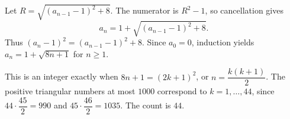 Let $R=\sqrt{(a_{n-1}-1)^2+8}$. The numerator is $R^2-1$, so cancellation gives
\[
a_n=1+\sqrt{(a_{n-1}-1)^2+8}.
\]
Thus $(a_n-1)^2=(a_{n-1}-1)^2+8$. Since $a_0=0$, induction yields $a_n=1+\sqrt{8n+1}$ for $n\ge1$.

This is an integer exactly when $8n+1=(2k+1)^2$, or $n=\dfrac{k(k+1)}{2}$. The positive triangular numbers at most $1000$ correspond to $k=1,\ldots,44$, since $44\cdot\dfrac{45}{2}=990$ and $45\cdot\dfrac{46}{2}=1035$. The count is $\boxed{44}$.
